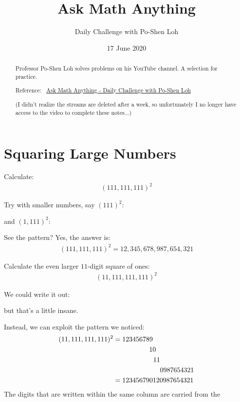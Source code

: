\documentclass[12pt]{article}
\title{Ask Math Anything}
\author{Daily Challenge with Po-Shen Loh}
\date{17 June 2020}
\begin{document}
\begin{minipage}{\textwidth}
\maketitle
\begin{abstract}
Professor Po-Shen Loh solves problems on his YouTube channel. A selection for practice. 

Reference:~ 
\href{https://www.youtube.com/channel/UCf78EJOm4wQ4xXwSS15PuxQ}{Ask Math Anything - Daily Challenge with Po-Shen Loh}

(I didn't realize the streams are deleted after a week, so unfortunately I no longer have access to the video to complete these notes...)
\end{abstract}
\end{minipage}


\section*{Squaring Large Numbers}
Calculate:
\begin{align*}
(111,111,111)^{2}
\end{align*}

\begin{answer}
Try with smaller numbers, say $(111)^{2}$:
\begin{center}
\qquad
\end{center}
and $(1,111)^{2}$:
\begin{center}
\qquad
\end{center}
See the pattern? Yes, the answer is:
\begin{align*}
(111,111,111)^{2} = 12,345,678,987,654,321
\end{align*}
\end{answer}

Calculate the even larger $11$-digit square of ones:
\begin{align*}
(11,111,111,111)^{2}
\end{align*}

\begin{answer}
We could write it out:
\begin{center}
\qquad
\end{center}
but that's a little insane.

Instead, we can exploit the pattern we noticed:
\begin{align*}
(11,111,111,111)^{2}
& = 123456789\\
& \hspace{5.3em} 10\\
& \hspace{5.9em} 11\\
& \hspace{6.9em} 0987654321 \\
& = 123456790120987654321 
\end{align*}
The digits that are written within the same column are carried from the 

\end{answer}


\end{document}

